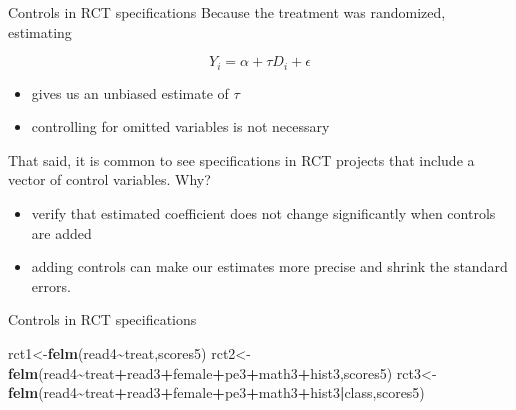\documentclass[
  ignorenonframetext,
]{beamer}
\newenvironment{Shaded}{\begin{snugshade}}{\end{snugshade}}
\newcommand{\KeywordTok}[1]{\textcolor[rgb]{0.13,0.29,0.53}{\textbf{#1}}}
\newcommand{\NormalTok}[1]{#1}
\newcommand{\OperatorTok}[1]{\textcolor[rgb]{0.81,0.36,0.00}{\textbf{#1}}}
\begin{document}
\begin{frame}{Controls in RCT specifications}
\protect\hypertarget{controls-in-rct-specifications-1}{}
Because the treatment was randomized, estimating

\[
Y_i=\alpha+\tau D_i+\epsilon
\]

\begin{itemize}
\item
  gives us an unbiased estimate of \(\tau\)
\item
  controlling for omitted variables is not necessary
\end{itemize}

That said, it is common to see specifications in RCT projects that
include a vector of control variables. Why?

\begin{itemize}
\item
  verify that estimated coefficient does not change significantly when
  controls are added
\item
  adding controls can make our estimates more precise and shrink the
  standard errors.
\end{itemize}
\end{frame}

\begin{frame}[fragile]{Controls in RCT specifications}
\protect\hypertarget{controls-in-rct-specifications-2}{}
\tiny

\begin{Shaded}
\begin{Highlighting}[]
\NormalTok{rct1\textless{}{-}}\KeywordTok{felm}\NormalTok{(read4}\OperatorTok{\textasciitilde{}}\NormalTok{treat,scores5)}
\NormalTok{rct2\textless{}{-}}\KeywordTok{felm}\NormalTok{(read4}\OperatorTok{\textasciitilde{}}\NormalTok{treat}\OperatorTok{+}\NormalTok{read3}\OperatorTok{+}\NormalTok{female}\OperatorTok{+}\NormalTok{pe3}\OperatorTok{+}\NormalTok{math3}\OperatorTok{+}\NormalTok{hist3,scores5)}
\NormalTok{rct3\textless{}{-}}\KeywordTok{felm}\NormalTok{(read4}\OperatorTok{\textasciitilde{}}\NormalTok{treat}\OperatorTok{+}\NormalTok{read3}\OperatorTok{+}\NormalTok{female}\OperatorTok{+}\NormalTok{pe3}\OperatorTok{+}\NormalTok{math3}\OperatorTok{+}\NormalTok{hist3}\OperatorTok{|}\NormalTok{class,scores5)}
\end{Highlighting}
\end{Shaded}
\end{frame}
\end{document}
